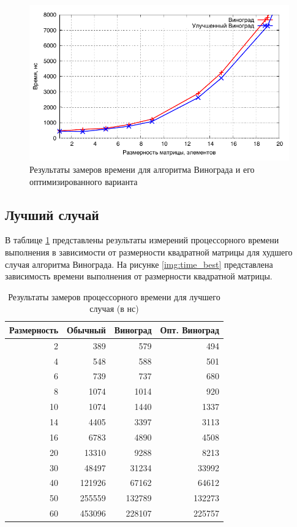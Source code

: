 \noindent
\begin{figure}[h!]
	\centering
    \includegraphics[width=0.75\linewidth]{../data/time_winograd_worst}
    \caption{Результаты замеров времени для алгоритма Винограда и его оптимизированного варианта}
    \label{img:time_winograd_worst}
\end{figure}


\subsection{Лучший случай}

В таблице \ref{table:time_best} представлены результаты измерений процессорного времени выполнения в зависимости от размерности квадратной матрицы для худшего случая алгоритма Винограда. На рисунке \ref{img:time_best} представлена зависимость времени выполнения от размерности квадратной матрицы.

\begin{table}[h]
  \caption{\label{table:time_best} Результаты замеров процессорного времени для лучшего случая (в нс)}
  \begin{center}
    \begin{tabular}{|r|r|r|r|}
      \hline
      Размерность & Обычный & Виноград & Опт. Виноград\\ \hline
      2 & 389 & 579 & 494 \\ \hline
      4 & 548 & 588 & 501 \\ \hline
      6 & 739 & 737 & 680 \\ \hline
      8 & 1074 & 1014 & 920 \\ \hline
      10 & 1074 & 1440 & 1337 \\ \hline
      14 & 4405 & 3397 & 3113 \\ \hline
      16 & 6783 & 4890 & 4508 \\ \hline
      20 & 13310 & 9288 & 8213 \\ \hline
      30 & 48497 & 31234 & 33992 \\ \hline
      40 & 121926 & 67162 & 64612 \\ \hline
      50 & 255559 & 132789 & 132273 \\ \hline
      60 & 453096 & 228107 & 225757 \\ \hline
    \end{tabular}
  \end{center}
\end{table}

